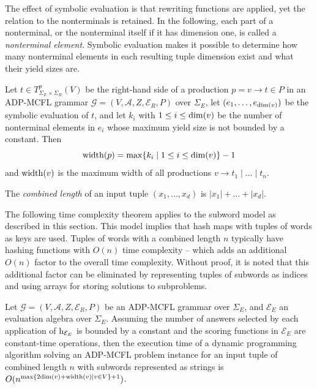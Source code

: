 \documentclass[
    a4paper,
    12pt,
    twoside,
    BCOR=12mm,
    parskip=half,
    chapterprefix,
    numbers=noenddot,
    bibliography=totoc
]{scrbook}
\begin{document}
The effect of symbolic evaluation is that rewriting functions are applied, yet the relation to the nonterminals is retained. In the following, each part of a nonterminal, or the nonterminal itself if it has dimension one, is called a \emph{nonterminal element}. Symbolic evaluation makes it possible to determine how many nonterminal elements in each resulting tuple dimension exist and what their yield sizes are.

\begin{definition}
	Let $t \in T^p_{\Sigma_E \times \Sigma_R}(V)$ be the right-hand side of a production $p=v \to t \in P$ in an ADP-MCFL grammar $\mathcal{G}=(V,\mathcal{A},Z,\mathcal{E}_R,P)$ over $\Sigma_E$, let $(e_1,\ldots,e_{\mathrm{dim}(v)})$ be the symbolic evaluation of $t$, and let $k_i$ with $1 \leq i \leq \mathrm{dim}(v)$ be the number of nonterminal elements in $e_i$ whose maximum yield size is not bounded by a constant. Then 
	\[ \mathrm{width}(p) = \max \{ k_i \mid 1 \leq i \leq \mathrm{dim}(v) \} - 1 \]
	and $\mathrm{width}(v)$ is the maximum width of all productions $v \to t_1 \mid \ldots \mid t_n$.
\end{definition}

\begin{definition}
	The \emph{combined length} of an input tuple $(x_1,\ldots,x_d)$ is $|x_1|+ \ldots +|x_d|$.
\end{definition}

The following time complexity theorem applies to the subword model as described in this section.
This model implies that hash maps with tuples of words as keys are used. Tuples of words with a combined length $n$ typically have hashing functions with $O(n)$ time complexity -- which adds an additional $O(n)$ factor to the overall time complexity. Without proof, it is noted that this additional factor can be eliminated by representing tuples of subwords as indices and using arrays for storing solutions to subproblems.

\begin{theorem}
	\label{thm:adpmcfl_runtime}
	Let $\mathcal{G}=(V,\mathcal{A},Z,\mathcal{E}_R,P)$ be an ADP-MCFL grammar over $\Sigma_E$, and $\mathcal{E}_E$ an evaluation algebra over $\Sigma_E$. Assuming the number of answers selected by each application of $\mathrm{h}_{\mathcal{E}_E}$ is bounded by a constant and the scoring functions in $\mathcal{E}_E$ are constant-time operations, then the execution time of a dynamic programming algorithm solving an ADP-MCFL problem instance for an input tuple of combined length $n$ with subwords represented as strings is $O(n^{\max \{2\mathrm{dim}(v)+\mathrm{width}(v) \mid v \in V \}+1})$.
\end{theorem}
\end{document}
